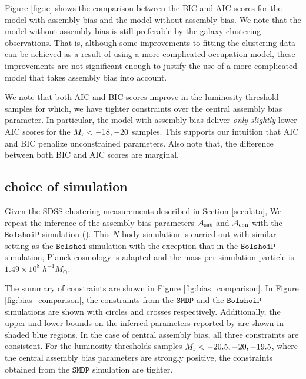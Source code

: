 \documentclass[12pt, preprint]{aastex}
\newcommand{\acen}{\mathcal{A}_{\rm cen}}
\newcommand{\asat}{\mathcal{A}_{\rm sat}}
\begin{document}
Figure \ref{fig:ic} shows the comparison between the BIC and AIC scores for the model with assembly bias and the model without assembly bias. We note that the model without assembly bias is still preferable by the galaxy clustering observations. That is, although some improvements to fitting the clustering data can be achieved as a result of using a more complicated occupation model, these improvements are not significant enough to justify the use of a more complicated model that takes assembly bias into account. 

We note that both AIC and BIC scores improve in the luminosity-threshold samples for which, we have tighter constraints over the central assembly bias parameter. In particular, the model with assembly bias deliver \emph{only} \emph{slightly} lower AIC scores for the $M_{\rm r}<-18, -20$ samples. This supports our intuition that AIC and BIC penalize unconstrained parameters. Also note that, the difference between both BIC and AIC scores are marginal.

\subsection{choice of simulation}

Given the SDSS clustering measurements described in Section \ref{sec:data}, We repeat the inference of the assembly bias parameters $\asat$ and $\acen$ with the $\mathtt{BolshoiP}$ simulation (\citealt{smallmultidark}). This $N$-body simulation is carried out with similar setting as the $\mathtt{Bolshoi}$ simulation with the exception that in the $\mathtt{BolshoiP}$ simulation, Planck cosmology is adapted and the mass per simulation particle is $1.49\times 10^8 \; h^{-1} M_{\odot}$. 

The summary of constraints are shown in Figure \ref{fig:bias_comparison}. In Figure \ref{fig:bias_comparison}, the constraints from the $\mathtt{SMDP}$ and the $\mathtt{BolshoiP}$ simulations are shown with circles and crosses respectively. Additionally, the upper and lower bounds on the inferred parameters reported by \citet{zentner2016} are shown in shaded blue regions. In the case of central assembly bias, all three constraints are consistent. For the luminosity-thresholds samples $M_{\rm r}<-20.5, -20, -19.5$, where the central assembly bias parameters are strongly positive, the constraints obtained from the $\mathtt{SMDP}$ simulation are tighter. 
  
\end{document}
